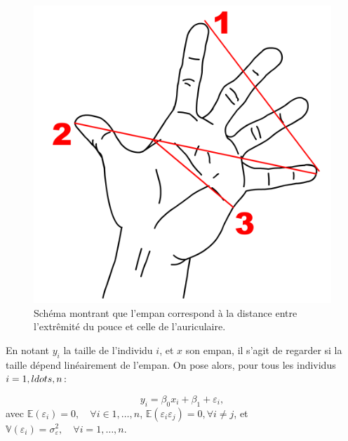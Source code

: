 \documentclass[
  11pt,
]{book}
\numberwithin{equation}{section}
\numberwithin{countremarque}{section}
\begin{document}
\begin{figure}
\centering
\includegraphics[width=5.20833in,height=\textheight]{figs/Mesures_de_la_main_artlibre_jnl.png}
\caption{\label{fig:illustration-empan} Schéma montrant que l'empan correspond à la distance entre l'extrêmité du pouce et celle de l'auriculaire.}
\end{figure}

En notant \(y_i\) la taille de l'individu \(i\), et \(x\) son empan, il s'agit de regarder si la taille dépend linéairement de l'empan. On pose alors, pour tous les individus \(i = 1, \\ldots, n\):

\[y_i = \beta_0 x_i + \beta_1 + \varepsilon_i,\]
avec \(\mathbb{E}(\varepsilon_i) = 0, \quad \forall i \in 1,\ldots, n\), \(\mathbb{E}(\varepsilon_i \varepsilon_j) = 0, \forall i \ne j\), et \(\mathbb{V}(\varepsilon_i) = \sigma^2_{\varepsilon}, \quad \forall i = 1, \ldots, n.\)
\end{document}
